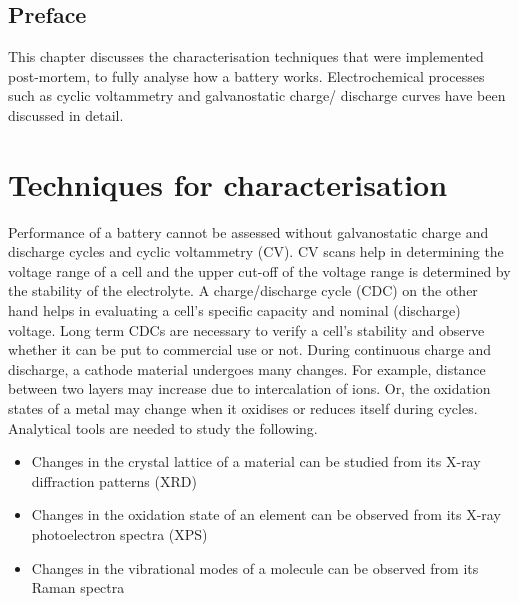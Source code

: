 \section*{\centering Preface}
This chapter discusses the characterisation techniques that were implemented post-mortem, to fully analyse how a battery works. Electrochemical processes such as cyclic voltammetry and galvanostatic charge/ discharge curves have been discussed in detail.   

\pagebreak

\chapter{Techniques for characterisation} %

\label{chap2} %

Performance of a battery cannot be assessed without galvanostatic charge and discharge cycles and cyclic voltammetry (CV). CV scans help in determining the voltage range of a cell and the upper cut-off of the voltage range is determined by the stability of the electrolyte. A charge/discharge cycle (CDC) on the other hand helps in evaluating a cell's specific capacity and nominal (discharge) voltage. Long term CDCs are necessary to verify a cell's stability and observe whether it can be put to commercial use or not. 
During continuous charge and discharge, a cathode material undergoes many changes. For example, distance between two layers may increase due to intercalation of ions. Or, the oxidation states of a metal may change when it oxidises or reduces itself during cycles. Analytical tools are needed to study the following. 

\begin{itemize}
    \item Changes in the crystal lattice of a material can be studied from its X-ray diffraction patterns (XRD)
    \item Changes in the oxidation state of an element can be observed from its X-ray photoelectron spectra (XPS)
    \item Changes in the vibrational modes of a molecule can be observed from its Raman spectra 
\end{itemize}

